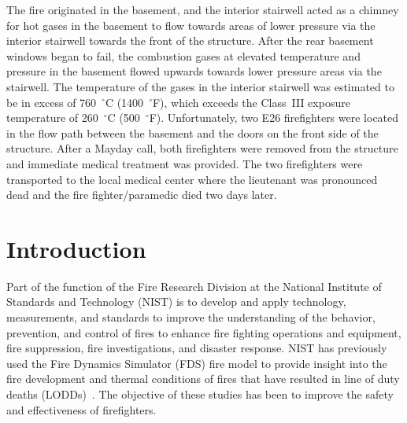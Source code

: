 \documentclass[12pt,oneside]{book}
\begin{document}
The fire originated in the basement, and the interior stairwell acted as a chimney for hot gases in the basement to flow towards areas of lower pressure via the interior stairwell towards the front of the structure. After the rear basement windows began to fail, the combustion gases at elevated temperature and pressure in the basement flowed upwards towards lower pressure areas via the stairwell. The temperature of the gases in the interior stairwell was estimated to be in excess of 760~$^{\circ}$C (1400~$^{\circ}$F), which exceeds the Class~III exposure temperature of 260~$^{\circ}$C (500~$^{\circ}$F). Unfortunately, two E26 firefighters were located in the flow path between the basement and the doors on the front side of the structure. After a Mayday call, both firefighters were removed from the structure and immediate medical treatment was provided. The two firefighters were transported to the local medical center where the lieutenant was pronounced dead and the fire fighter/paramedic died two days later.


\chapter{Introduction}
\label{sec:introduction}
\setcounter{page}{1}

Part of the function of the Fire Research Division at the National Institute of Standards and Technology (NIST) is to develop and apply technology, measurements, and standards to improve the understanding of the behavior, prevention, and control of fires to enhance fire fighting operations and equipment, fire suppression, fire investigations, and disaster response. NIST has previously used the Fire Dynamics Simulator (FDS) fire model to provide insight into the fire development and thermal conditions of fires that have resulted in line of duty deaths (LODDs)~\cite{Madrzykowski:1,Iowa,Texas,Bryner:Charleston,barowy:texas,Weinschenk:Chicago}. The objective of these studies has been to improve the safety and effectiveness of firefighters.
\end{document}
